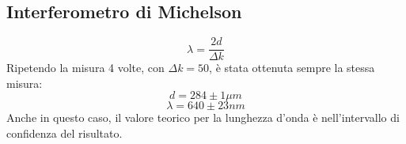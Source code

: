 \subsection{Interferometro di Michelson}
$$ \lambda = \frac{2d}{\Delta k} $$
Ripetendo la misura 4 volte, con $\Delta k = 50$, è stata ottenuta sempre la stessa misura:
    $$ d = 284 \pm 1 \mu m $$
    $$ \lambda = 640 \pm 23 nm $$
Anche in questo caso, il valore teorico per la lunghezza d'onda è nell'intervallo di confidenza del risultato.